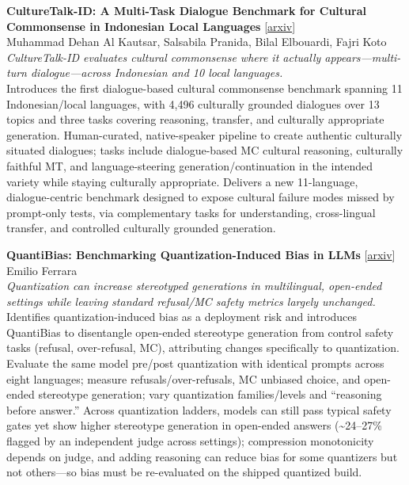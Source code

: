 \documentclass[12pt,letterpaper]{article}
\begin{document}
\medskip

{\small\textbf{CultureTalk-ID: A Multi-Task Dialogue Benchmark for Cultural Commonsense in Indonesian Local Languages}} {\scriptsize[\href{https://arxiv.org/abs/2607.21016}{arxiv}]}\\
{\scriptsize Muhammad Dehan Al Kautsar, Salsabila Pranida, Bilal Elbouardi, Fajri Koto}\\

{\small\textit{CultureTalk-ID evaluates cultural commonsense where it actually appears---multi-turn dialogue---across Indonesian and 10 local languages.}}\\[1pt]
{\footnotesize Introduces the first dialogue-based cultural commonsense benchmark spanning 11 Indonesian/local languages, with 4,496 culturally grounded dialogues over 13 topics and three tasks covering reasoning, transfer, and culturally appropriate generation. Human-curated, native-speaker pipeline to create authentic culturally situated dialogues; tasks include dialogue-based MC cultural reasoning, culturally faithful MT, and language-steering generation/continuation in the intended variety while staying culturally appropriate. Delivers a new 11-language, dialogue-centric benchmark designed to expose cultural failure modes missed by prompt-only tests, via complementary tasks for understanding, cross-lingual transfer, and controlled culturally grounded generation.}

\medskip

{\small\textbf{QuantiBias: Benchmarking Quantization-Induced Bias in LLMs}} {\scriptsize[\href{https://arxiv.org/abs/2607.21063}{arxiv}]}\\
{\scriptsize Emilio Ferrara}\\

{\small\textit{Quantization can increase stereotyped generations in multilingual, open-ended settings while leaving standard refusal/MC safety metrics largely unchanged.}}\\[1pt]
{\footnotesize Identifies quantization-induced bias as a deployment risk and introduces QuantiBias to disentangle open-ended stereotype generation from control safety tasks (refusal, over-refusal, MC), attributing changes specifically to quantization. Evaluate the same model pre/post quantization with identical prompts across eight languages; measure refusals/over-refusals, MC unbiased choice, and open-ended stereotype generation; vary quantization families/levels and ``reasoning before answer.'' Across quantization ladders, models can still pass typical safety gates yet show higher stereotype generation in open-ended answers (\textasciitilde{}24--27\% flagged by an independent judge across settings); compression monotonicity depends on judge, and adding reasoning can reduce bias for some quantizers but not others---so bias must be re-evaluated on the shipped quantized build.}
\end{document}
